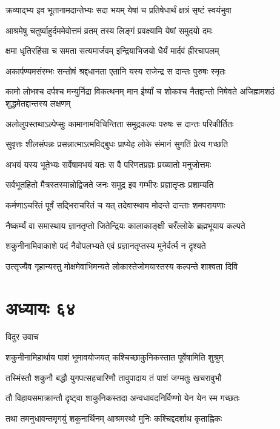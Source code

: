\twolineshloka
{क्रव्याद्भ्य इव भूतानामदान्तेभ्यः सदा भयम्}
{येषां च प्रतिषेधार्थं क्षत्रं सृष्टं स्वयंभुवा}


\twolineshloka
{आश्रमेषु चतुर्ष्वाहुर्दममेवोत्तमं व्रतम्}
{तस्य लिङ्गं प्रवक्ष्यामि येषां समुदयो दमः}


\twolineshloka
{क्षमा धृतिरहिंसा च समता सत्यमार्जवम्}
{इन्द्रियाभिजयो धैर्यं मार्दवं ह्रीरचापलम्}


\twolineshloka
{अकार्पण्यमसंरम्भः सन्तोषं श्रद्दधानता}
{एतानि यस्य राजेन्द्र स दान्तः पुरुषः स्मृतः}


\threelineshloka
{कामो लोभश्च दर्पश्च मन्युर्निद्रा विकत्थनम्}
{मान ईर्ष्यां च शोकश्च नैतद्दान्तो निषेवते}
{अजिह्ममशठं शुद्धमेतद्दान्तस्य लक्षणम्}


\twolineshloka
{अलोलुपस्तथाऽल्पेप्सुः कामानामविचिन्तिता}
{समुद्रकल्पः परुषः स दान्तः परिकीर्तितः}


\twolineshloka
{सुवृत्तः शीलसंपन्नः प्रसन्नात्माऽत्मविद्बुधः}
{प्राप्येह लोके संमानं सुगतिं प्रेत्य गच्छति}


\twolineshloka
{अभयं यस्य भूतेभ्यः सर्वेषामभयं यतः}
{स वै परिणतप्रज्ञः प्रख्यातो मनुजोत्तमः}


\twolineshloka
{सर्वभूतहितो मैत्रस्तस्मान्नोद्विजते जनः}
{समुद्र इव गम्भीरः प्रज्ञातृप्तः प्रशाम्यति}


\twolineshloka
{कर्मणाऽचरितं पूर्वं सद्भिराचरितं च यत्}
{तदेवास्थाय मोदन्ते दान्ताः शमपरायणाः}


\twolineshloka
{नैष्कर्म्यं वा समास्थाय ज्ञानतृप्तो जितेन्द्रियः}
{कालाकाङ्क्षी चरँल्लोके ब्रह्मभूयाय कल्पते}


\twolineshloka
{शकुनीनामिवाकाशे पदं नैवोपलभ्यते}
{एवं प्रज्ञानतृप्तस्य मुनेर्वर्त्म न दृश्यते}


\twolineshloka
{उत्सृज्यैव गृहान्यस्तु मोक्षमेवाभिमन्यते}
{लोकास्तेजोमयास्तस्य कल्पन्ते शाश्वता दिवि}


\chapter{अध्यायः ६४}
\twolineshloka
{विदुर उवाच}
{}


\twolineshloka
{शकुनीनामिहार्थाय पाशं भूमावयोजयत्}
{कश्चिच्छाकुनिकस्तात पूर्वेषामिति शुश्रुम्}


\twolineshloka
{तस्मिंस्तौ शकुनौ बद्धौ युगपत्सहचारिणौ}
{तावुपादाय तं पाशं जग्मतुः खचरावुभौ}


\twolineshloka
{तौ विहायसमाक्रान्तौ दृष्ट्वा शाकुनिकस्तदा}
{अन्वधावदनिर्विण्णो येन येन स्म गच्छतः}


\twolineshloka
{तथा तमनुधावन्तमृगयुं शकुनार्थिनम्}
{आश्रमस्थो मुनिः कश्चिद्ददर्शाथ कृताह्निकः}


